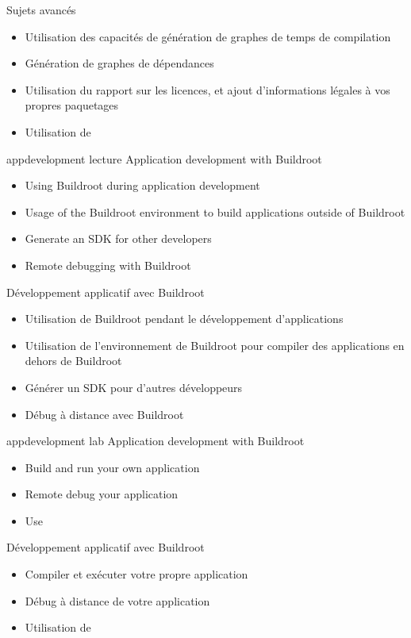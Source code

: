 {Sujets avancés}
{
  \begin{itemize}
  \item Utilisation des capacités de génération de graphes de temps de
	compilation
  \item Génération de graphes de dépendances
  \item Utilisation du rapport sur les licences, et ajout d'informations
	légales à vos propres paquetages 
  \item Utilisation de 
  \end{itemize}
}
{appdevelopment}
{lecture}
{Application development with Buildroot}
{
  \begin{itemize}
  \item Using Buildroot during application development
  \item Usage of the Buildroot environment to build applications
    outside of Buildroot
  \item Generate an SDK for other developers
  \item Remote debugging with Buildroot
  \end{itemize}
}
{Développement applicatif avec Buildroot}
{
  \begin{itemize}
  \item Utilisation de Buildroot pendant le développement d'applications
  \item Utilisation de l'environnement de Buildroot pour compiler des
	applications en dehors de Buildroot
  \item Générer un SDK pour d'autres développeurs
  \item Débug à distance avec Buildroot
  \end{itemize}
}
{appdevelopment}
{lab}
{Application development with Buildroot}
{
  \begin{itemize}
  \item Build and run your own application
  \item Remote debug your application
  \item Use 
  \end{itemize}
}
{Développement applicatif avec Buildroot}
{
  \begin{itemize}
  \item Compiler et exécuter votre propre application
  \item Débug à distance de votre application
  \item Utilisation de 
  \end{itemize}
}
